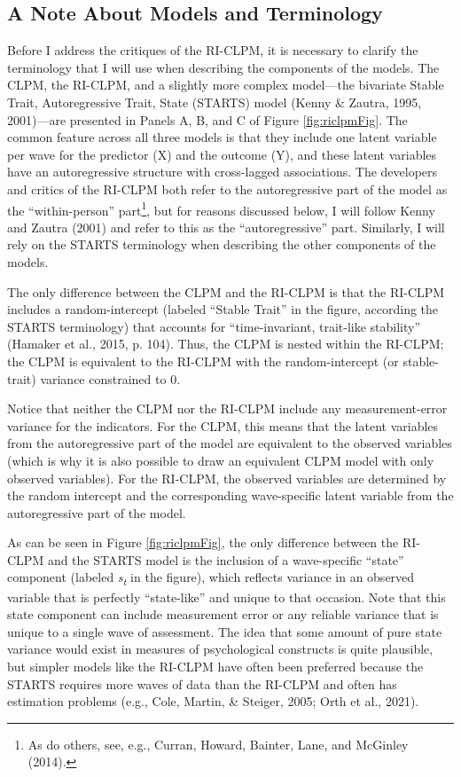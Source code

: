 \documentclass[
  english,
  man,floatsintext]{apa6}
\begin{document}
\hypertarget{a-note-about-models-and-terminology}{%
\subsection{A Note About Models and Terminology}\label{a-note-about-models-and-terminology}}

Before I address the critiques of the RI-CLPM, it is necessary to clarify the terminology that I will use when describing the components of the models. The CLPM, the RI-CLPM, and a slightly more complex model---the bivariate Stable Trait, Autoregressive Trait, State (STARTS) model (Kenny \& Zautra, 1995, 2001)---are presented in Panels A, B, and C of Figure \ref{fig:riclpmFig}. The common feature across all three models is that they include one latent variable per wave for the predictor (X) and the outcome (Y), and these latent variables have an autoregressive structure with cross-lagged associations. The developers and critics of the RI-CLPM both refer to the autoregressive part of the model as the ``within-person'' part\footnote{As do others, see, e.g., Curran, Howard, Bainter, Lane, and McGinley (2014).}, but for reasons discussed below, I will follow Kenny and Zautra (2001) and refer to this as the ``autoregressive'' part. Similarly, I will rely on the STARTS terminology when describing the other components of the models.

The only difference between the CLPM and the RI-CLPM is that the RI-CLPM includes a random-intercept (labeled ``Stable Trait'' in the figure, according the STARTS terminology) that accounts for ``time-invariant, trait-like stability'' (Hamaker et al., 2015, p. 104). Thus, the CLPM is nested within the RI-CLPM; the CLPM is equivalent to the RI-CLPM with the random-intercept (or stable-trait) variance constrained to 0.

Notice that neither the CLPM nor the RI-CLPM include any measurement-error variance for the indicators. For the CLPM, this means that the latent variables from the autoregressive part of the model are equivalent to the observed variables (which is why it is also possible to draw an equivalent CLPM model with only observed variables). For the RI-CLPM, the observed variables are determined by the random intercept and the corresponding wave-specific latent variable from the autoregressive part of the model.

As can be seen in Figure \ref{fig:riclpmFig}, the only difference between the RI-CLPM and the STARTS model is the inclusion of a wave-specific ``state'' component (labeled \emph{s\textsubscript{t}} in the figure), which reflects variance in an observed variable that is perfectly ``state-like'' and unique to that occasion. Note that this state component can include measurement error or any reliable variance that is unique to a single wave of assessment. The idea that some amount of pure state variance would exist in measures of psychological constructs is quite plausible, but simpler models like the RI-CLPM have often been preferred because the STARTS requires more waves of data than the RI-CLPM and often has estimation problems (e.g., Cole, Martin, \& Steiger, 2005; Orth et al., 2021).
\end{document}

